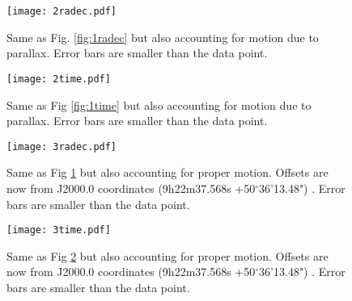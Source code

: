 \documentclass[preprint]{aastex}
\begin{document}
\begin{figure}
\begin{center}
    \texttt{[image: 2radec.pdf]}
    \caption{Same as Fig. \ref{fig:1radec} but also accounting for motion due to parallax. Error bars are smaller than the data point.}
    \label{fig:2radec}
\end{center}
\end{figure}

\begin{figure}
\begin{center}
    \texttt{[image: 2time.pdf]}
    \caption{Same as Fig \ref{fig:1time} but also accounting for motion due to parallax. Error bars are smaller than the data point.}
    \label{fig:2time}
\end{center}
\end{figure}

\begin{figure}
\begin{center}
    \texttt{[image: 3radec.pdf]}
    \caption{Same as Fig \ref{fig:2radec} but also accounting for proper motion. Offsets are now from J2000.0 coordinates (9h22m37.568s +50$^\circ$36'13.48") . Error bars are smaller than the data point.}
    \label{fig:3radec}
\end{center}
\end{figure}

\begin{figure}
\begin{center}
    \texttt{[image: 3time.pdf]}
    \caption{Same as Fig \ref{fig:2time} but also accounting for proper motion. Offsets are now from J2000.0 coordinates (9h22m37.568s +50$^\circ$36'13.48") . Error bars are smaller than the data point.}
    \label{fig:3time}
\end{center}
\end{figure}

\cleardoublepage



\end{document}
